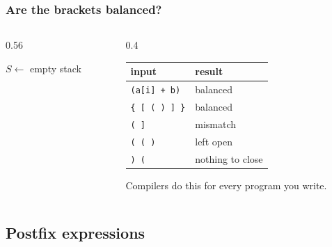 \documentclass[aspectratio=169,10pt,compress]{beamer}
\begin{document}
\begin{frame}[t,fragile] \frametitle{Are the brackets balanced?}
  \begin{columns}[T]
    \begin{column}{0.56\textwidth}
      \SetAlFnt{\small}


\begin{algorithm}[H]
  \caption{Balanced}
  $S \gets$ empty stack\;
  \;
\end{algorithm}

    \end{column}
    \begin{column}{0.4\textwidth}
      \small
      \begin{tabular}{ll}
        \toprule
        \textbf{input} & \textbf{result} \\
        \midrule
        \texttt{(a[i] + b)}   & balanced \\
        \texttt{\{ [ ( ) ] \}} & balanced \\
        \texttt{( ]}          & mismatch \\
        \texttt{( ( )}        & left open \\
        \texttt{) (}          & nothing to close \\
        \bottomrule
      \end{tabular}
      \vspace{0.4em}

      Compilers do this for every program you write.
    \end{column}
  \end{columns}
\end{frame}

\subsection[Postfix]{Postfix expressions}
\end{document}
